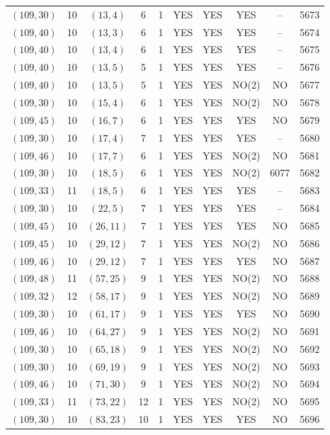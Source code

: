 \begin{longtable}{|c|c|c|c|c|c|c|c|c|c|}
$(109, 30)$ & 10 & $(13, 4)$ & 6 & 1 & YES & YES & YES & -- & 5673\\
$(109, 40)$ & 10 & $(13, 3)$ & 6 & 1 & YES & YES & YES & -- & 5674\\
$(109, 40)$ & 10 & $(13, 4)$ & 6 & 1 & YES & YES & YES & -- & 5675\\
$(109, 40)$ & 10 & $(13, 5)$ & 5 & 1 & YES & YES & YES & -- & 5676\\
$(109, 40)$ & 10 & $(13, 5)$ & 5 & 1 & YES & YES & NO(2) & NO & 5677\\
$(109, 30)$ & 10 & $(15, 4)$ & 6 & 1 & YES & YES & NO(2) & NO & 5678\\
$(109, 45)$ & 10 & $(16, 7)$ & 6 & 1 & YES & YES & YES & NO & 5679\\
$(109, 30)$ & 10 & $(17, 4)$ & 7 & 1 & YES & YES & YES & -- & 5680\\
$(109, 46)$ & 10 & $(17, 7)$ & 6 & 1 & YES & YES & NO(2) & NO & 5681\\
$(109, 30)$ & 10 & $(18, 5)$ & 6 & 1 & YES & YES & NO(2) & 6077 & 5682\\
$(109, 33)$ & 11 & $(18, 5)$ & 6 & 1 & YES & YES & YES & -- & 5683\\
$(109, 30)$ & 10 & $(22, 5)$ & 7 & 1 & YES & YES & YES & -- & 5684\\
$(109, 45)$ & 10 & $(26, 11)$ & 7 & 1 & YES & YES & YES & NO & 5685\\
$(109, 45)$ & 10 & $(29, 12)$ & 7 & 1 & YES & YES & NO(2) & NO & 5686\\
$(109, 46)$ & 10 & $(29, 12)$ & 7 & 1 & YES & YES & YES & NO & 5687\\
$(109, 48)$ & 11 & $(57, 25)$ & 9 & 1 & YES & YES & NO(2) & NO & 5688\\
$(109, 32)$ & 12 & $(58, 17)$ & 9 & 1 & YES & YES & NO(2) & NO & 5689\\
$(109, 30)$ & 10 & $(61, 17)$ & 9 & 1 & YES & YES & YES & NO & 5690\\
$(109, 46)$ & 10 & $(64, 27)$ & 9 & 1 & YES & YES & NO(2) & NO & 5691\\
$(109, 30)$ & 10 & $(65, 18)$ & 9 & 1 & YES & YES & NO(2) & NO & 5692\\
$(109, 30)$ & 10 & $(69, 19)$ & 9 & 1 & YES & YES & NO(2) & NO & 5693\\
$(109, 46)$ & 10 & $(71, 30)$ & 9 & 1 & YES & YES & NO(2) & NO & 5694\\
$(109, 33)$ & 11 & $(73, 22)$ & 12 & 1 & YES & YES & NO(2) & NO & 5695\\
$(109, 30)$ & 10 & $(83, 23)$ & 10 & 1 & YES & YES & YES & NO & 5696\\

\end{longtable}
